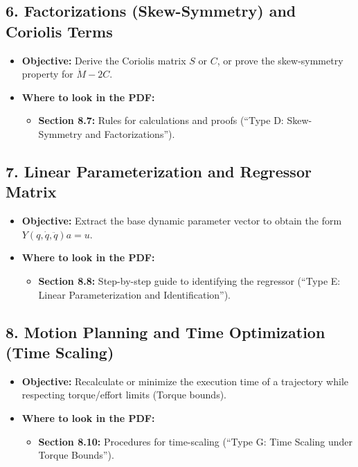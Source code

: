 \documentclass[11pt,a4paper]{article}
\begin{document}
\subsection*{6. Factorizations (Skew-Symmetry) and Coriolis Terms}
\begin{itemize}
    \item \textbf{Objective:} Derive the Coriolis matrix $S$ or $C$, or prove the skew-symmetry property for $\dot{M} - 2C$.
    \item \textbf{Where to look in the PDF:}
    \begin{itemize}
        \item \textbf{Section 8.7:} Rules for calculations and proofs (``Type D: Skew-Symmetry and Factorizations'').
    \end{itemize}
\end{itemize}

\subsection*{7. Linear Parameterization and Regressor Matrix}
\begin{itemize}
    \item \textbf{Objective:} Extract the base dynamic parameter vector to obtain the form $Y(q, \dot{q}, \ddot{q}) a = u$.
    \item \textbf{Where to look in the PDF:}
    \begin{itemize}
        \item \textbf{Section 8.8:} Step-by-step guide to identifying the regressor (``Type E: Linear Parameterization and Identification'').
    \end{itemize}
\end{itemize}

\subsection*{8. Motion Planning and Time Optimization (Time Scaling)}
\begin{itemize}
    \item \textbf{Objective:} Recalculate or minimize the execution time of a trajectory while respecting torque/effort limits (Torque bounds).
    \item \textbf{Where to look in the PDF:}
    \begin{itemize}
        \item \textbf{Section 8.10:} Procedures for time-scaling (``Type G: Time Scaling under Torque Bounds'').
    \end{itemize}
\end{itemize}
\end{document}

